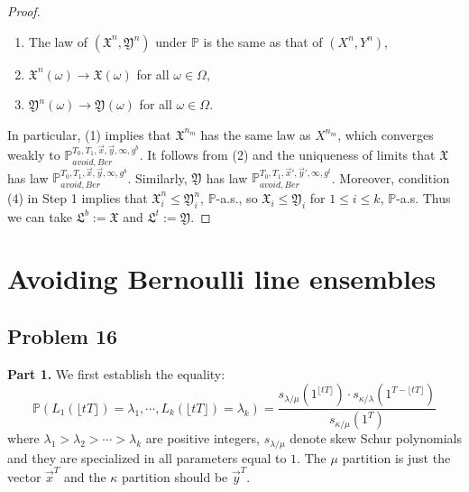 \documentclass[12pt]{article}
\begin{document}
\begin{proof}
\begin{enumerate}[label=(\arabic*)]
		\item The law of $(\mathfrak{X}^n,\mathfrak{Y}^n)$ under $\mathbb{P}$ is the same as that of $(X^n,Y^n)$,
		
		\item $\mathfrak{X}^n(\omega) \longrightarrow \mathfrak{X}(\omega)$ for all $\omega\in\Omega$,
		
		\item $\mathfrak{Y}^n(\omega) \longrightarrow \mathfrak{Y}(\omega)$ for all $\omega\in\Omega$.
		
	\end{enumerate}

	In particular, (1) implies that $\mathfrak{X}^{n_m}$ has the same law as $X^{n_m}$, which converges weakly to $\mathbb{P}_{avoid,Ber}^{T_0,T_1,\vec{x},\vec{y},\infty,g^b}$. It follows from (2) and the uniqueness of limits that $\mathfrak{X}$ has law $\mathbb{P}_{avoid,Ber}^{T_0,T_1,\vec{x},\vec{y},\infty,g^b}$. Similarly, $\mathfrak{Y}$ has law $\mathbb{P}_{avoid,Ber}^{T_0,T_1,\vec{x}',\vec{y}',\infty,g^t}$. Moreover, condition (4) in Step 1 implies that $\mathfrak{X}^n_i \leq \mathfrak{Y}^n_i$, $\mathbb{P}$-a.s., so $\mathfrak{X}_i \leq \mathfrak{Y}_i$ for $1\leq i\leq k$, $\mathbb{P}$-a.s. Thus we can take $\mathfrak{L}^b := \mathfrak{X}$ and $\mathfrak{L}^t := \mathfrak{Y}$.
	
	\end{proof}


\section{Avoiding Bernoulli line ensembles}

				\subsection*{Problem 16}
\textbf{Part 1. }We first establish the equality:
$$\mathbb{P}(L_{1}(\lfloor tT \rfloor) = \lambda_{1}, \cdots, L_{k}(\lfloor tT \rfloor) = \lambda_{k})=\frac{s_{\lambda/\mu}(1^{\lfloor tT \rfloor})\cdot s_{\kappa/\lambda}(1^{T-\lfloor tT \rfloor})}{s_{\kappa/\mu}(1^{T})}$$ where $\lambda_{1}>\lambda_{2}>\cdots >\lambda_{k}$ are positive integers, $s_{\lambda/\mu}$ denote skew Schur polynomials and they are specialized in all parameters equal to $1$. The $\mu$ partition is just the vector $\vec{x}^{T}$ and the $\kappa$ partition should be $\vec{y}^{T}$.
\end{document}
